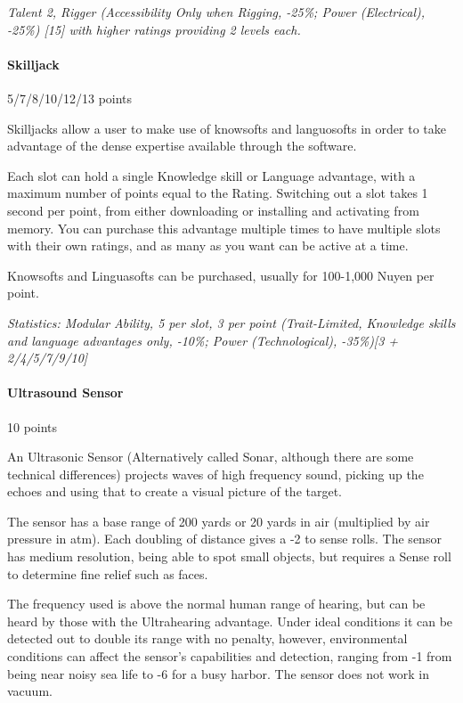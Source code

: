 \begin{multicols*}{3}
	\textit{\textcolor{OliveGreen}{Talent 2, Rigger (Accessibility  Only when Rigging, -25\%; Power (Electrical), -25\%) [15] with higher ratings providing 2 levels each.}}
	
	\paragraph{Skilljack}
	\begin{flushright}
		5/7/8/10/12/13 points
	\end{flushright}
	
	Skilljacks allow a user to make use of knowsofts and languosofts in order to take advantage of the dense expertise available through the software. 
	
	Each slot can hold a single Knowledge skill or Language advantage, with a maximum number of points equal to the Rating. Switching out a slot takes 1 second per point, from either downloading or installing and activating from memory. You can purchase this advantage multiple times to have multiple slots with their own ratings, and as many as you want can be active at a time.
	
	Knowsofts and Linguasofts can be purchased, usually for 100-1,000 Nuyen per point.
	
	\textit{\textcolor{OliveGreen}{Statistics: Modular Ability, 5 per slot, 3 per point (Trait-Limited, Knowledge skills and language advantages only, -10\%; Power (Technological), -35\%)[3 + 2/4/5/7/9/10]}}
	
	\paragraph{Ultrasound Sensor}
	\begin{flushright}
		10 points
	\end{flushright}
	
	An Ultrasonic Sensor (Alternatively called Sonar, although there are some technical differences) projects waves of high frequency sound, picking up the echoes and using that to create a visual picture of the target.
	
	The sensor has a base range of 200 yards or 20 yards in air (multiplied by air pressure in atm). Each doubling of distance gives a -2 to sense rolls. The sensor has medium resolution, being able to spot small objects, but requires a Sense roll to determine fine relief such as faces.
	
	The frequency used is above the normal human range of hearing, but can be heard by those with the Ultrahearing advantage. Under ideal conditions it can be detected out to double its range with no penalty, however, environmental conditions can affect the sensor's capabilities and detection, ranging from -1 from being near noisy sea life to -6 for a busy harbor. The sensor does not work in vacuum.
	

\end{multicols*}
